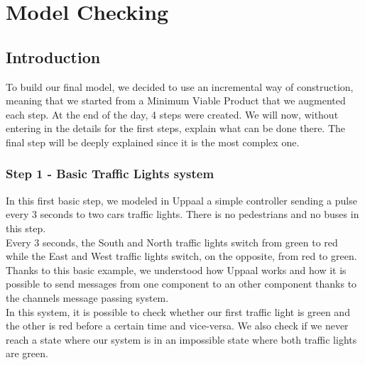 \section{Model Checking}
\subsection{Introduction}
To build our final model, we decided to use an incremental way of construction, meaning that we started from a Minimum Viable Product that we augmented each step. At the end of the day, 4 steps were created. We will now, without entering in the details for the first steps, explain what can be done there. The final step will be deeply explained since it is the most complex one.

\subsubsection{Step 1 - Basic Traffic Lights system}
In this first basic step, we modeled in Uppaal a simple controller sending a pulse every 3 seconds to two cars traffic lights. There is no pedestrians and no buses in this step. \\
Every 3 seconds, the South and North traffic lights switch from green to red while the East and West traffic lights switch, on the opposite, from red to green. \\
Thanks to this basic example, we understood how Uppaal works and how it is possible to send messages from one component to an other component thanks to the channels message passing system. \\
In this system, it is possible to check whether our first traffic light is green and the other is red before a certain time and vice-versa. We also check if we never reach a state where our system is in an impossible state where both traffic lights are green.
